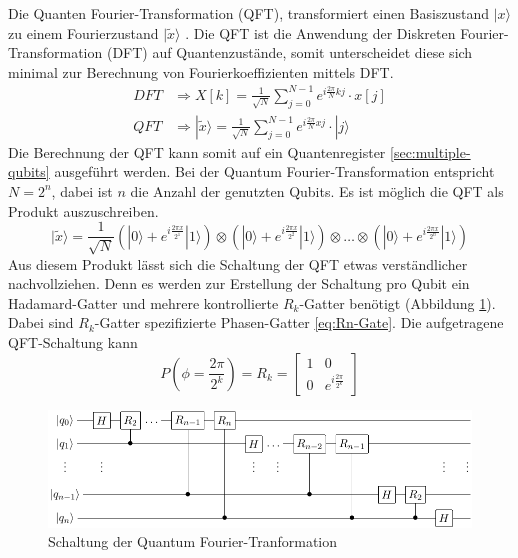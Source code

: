 Die Quanten Fourier-Transformation (QFT), transformiert einen Basiszustand $|x\rangle$ zu einem Fourierzustand $|\tilde{x}\rangle$ \cite{Qiskit-Textbook}. Die QFT ist die Anwendung der Diskreten Fourier-Transformation (DFT) auf Quantenzust\"ande, somit unterscheidet diese sich minimal zur Berechnung von Fourierkoeffizienten mittels DFT.
\begin{equation}
  \begin{aligned}
    DFT &\Rightarrow X[k] = \frac{1}{\sqrt{N}}\sum\limits_{j=0}^{N-1}e^{i\frac{2\pi}{N}kj}\cdot x[j] \\[1em]
    QFT &\Rightarrow |\tilde{x}\rangle = \frac{1}{\sqrt{N}}\sum\limits_{j=0}^{N-1}e^{i\frac{2\pi}{N}xj}\cdot|j\rangle
  \end{aligned}
\end{equation}
Die Berechnung der QFT kann somit auf ein Quantenregister \ref{sec:multiple-qubits} ausgef\"uhrt werden. Bei der Quantum Fourier-Transformation entspricht $N = 2^n$, dabei ist $n$ die Anzahl der genutzten Qubits. Es ist m\"oglich die QFT als Produkt auszuschreiben.
\begin{equation}
  |\tilde{x}\rangle = \frac{1}{\sqrt{N}} \left(|0\rangle + e^{i\frac{2\pi x}{2^1}}|1\rangle\right)\otimes\left(|0\rangle + e^{i\frac{2\pi x}{2^2}}|1\rangle\right)\otimes\dots\otimes\left(|0\rangle + e^{i\frac{2\pi x}{2^n}}|1\rangle\right)
\end{equation}
Aus diesem Produkt l\"asst sich die Schaltung der QFT etwas verst\"andlicher nachvollziehen. Denn es werden zur Erstellung der Schaltung pro Qubit ein Hadamard-Gatter und mehrere kontrollierte $R_k$-Gatter ben\"otigt (Abbildung \ref{fig:QFT-Circuit}). Dabei sind $R_k$-Gatter spezifizierte Phasen-Gatter \ref{eq:Rn-Gate}. Die aufgetragene QFT-Schaltung kann
\begin{equation}
\label{eq:Rn-Gate}
P\left(\phi = \frac{2\pi}{2^k}\right) = R_k = \begin{bmatrix}
    1 & 0 \\
    0 & e^{i\frac{2\pi}{2^k}}
    \end{bmatrix}
\end{equation}
\begin{figure}[h]
\centering
\includegraphics[width=1\textwidth]{figures/QFT.pdf}
\caption{Schaltung der Quantum Fourier-Tranformation}
\label{fig:QFT-Circuit}
\end{figure}
